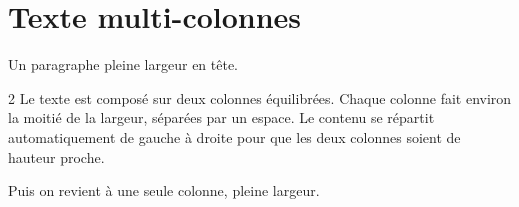 \documentclass{article}
\begin{document}
\hsize=380pt
\section{Texte multi-colonnes}
Un paragraphe pleine largeur en t\^ete.
\begin{multicols}{2}
Le texte est compos\'e sur deux colonnes \'equilibr\'ees. Chaque colonne fait environ la moiti\'e de la largeur, s\'epar\'ees par un espace. Le contenu se r\'epartit automatiquement de gauche \`a droite pour que les deux colonnes soient de hauteur proche.
\end{multicols}
Puis on revient \`a une seule colonne, pleine largeur.
\end{document}
